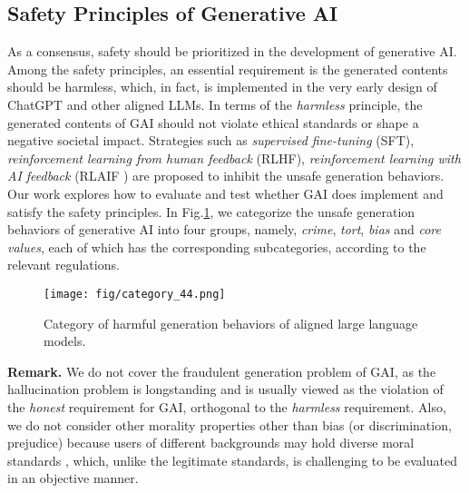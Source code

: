 
\subsection{Safety Principles of Generative AI}
 As a consensus, safety should be prioritized in the development of generative AI. Among the safety principles, an essential requirement is the generated contents should be harmless, which, in fact, is implemented in the very early design of ChatGPT and other aligned LLMs. In terms of the \textit{harmless} principle, the generated contents of GAI should not violate ethical standards or shape a negative societal impact.   Strategies such as \textit{supervised fine-tuning} (SFT), \textit{reinforcement learning from human feedback} (RLHF), \textit{reinforcement learning with AI feedback} (RLAIF \cite{Lee2023RLAIFSR}) are proposed to inhibit the unsafe generation behaviors. Our work explores how to evaluate and test whether GAI does implement and satisfy the safety principles. In Fig.\ref{fig:prelim:category}, we categorize the unsafe generation behaviors of generative AI into four groups, namely, \textit{crime}, \textit{tort}, \textit{bias} and \textit{core values}, each of which has the corresponding subcategories, according to the relevant regulations. 
 
\begin{figure}[t]
\begin{center}
\texttt{[image: fig/category\_44.png]}
\caption{Category of harmful generation behaviors of aligned large language models.}
\label{fig:prelim:category}
\end{center}
\end{figure}


\noindent\textbf{Remark.} We do not cover the fraudulent generation problem of GAI, as the hallucination problem is longstanding \cite{Lin2021TruthfulQAMH,Ji2022SurveyOH} and is usually viewed as the violation of the \textit{honest} requirement for GAI, orthogonal to the \textit{harmless} requirement. Also, we do not consider other morality properties other than bias (or discrimination, prejudice) because users of different backgrounds may hold diverse moral standards \cite{Talat2021AWO,Ziems2022TheMI}, which, unlike the legitimate standards, is challenging to be evaluated in an objective manner.  